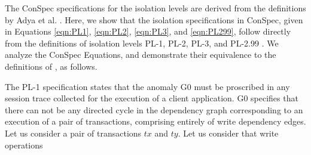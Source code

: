 \documentclass{sig-alternate-05-2015}
\begin{document}
\par The ConSpec specifications for the isolation levels are derived from the definitions by Adya et al.
\cite{DBLP:conf/icde/AdyaLO00}.  Here, we show that the isolation specifications in ConSpec, given in
Equations \ref{eqn:PL1}, \ref{eqn:PL2}, \ref{eqn:PL3}, and \ref{eqn:PL299}, follow directly from the
definitions of isolation levels PL-1, PL-2, PL-3, and PL-2.99 \cite{DBLP:conf/icde/AdyaLO00}. We analyze the
ConSpec Equations, and demonstrate their equivalence to the definitions of  \cite{DBLP:conf/icde/AdyaLO00}, as
follows.
\par  The PL-1 specification states that the anomaly G0 must be proscribed in any session trace collected
for the execution of a client application. G0 specifies that there can not be any directed cycle in the
dependency graph corresponding to an execution of a pair of transactions, comprising entirely of write dependency edges.
 Let us consider a pair of transactions $\mathit{tx}$ and $\mathit{ty}$. Let us consider that write operations
\end{document}
